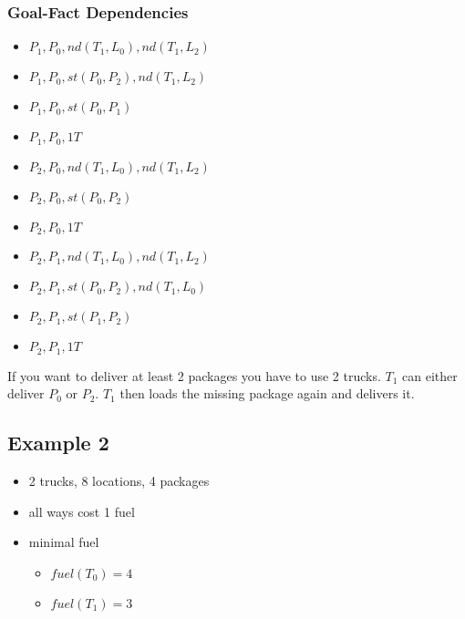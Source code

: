 \subsubsection{Goal-Fact Dependencies}
\begin{itemize}
	\item $P_1,P_0,nd(T_1,L_0),nd(T_1,L_2)$
	\item $P_1,P_0,st(P_0,P_2),nd(T_1,L_2)$
	\item $P_1,P_0,st(P_0,P_1)$
	\item $P_1,P_0,1T$
	\item $P_2,P_0,nd(T_1,L_0),nd(T_1,L_2)$
	\item $P_2,P_0,st(P_0,P_2)$
	\item $P_2,P_0,1T$
	\item $P_2,P_1,nd(T_1,L_0),nd(T_1,L_2)$
	\item $P_2,P_1,st(P_0,P_2),nd(T_1,L_0)$
	\item $P_2,P_1,st(P_1,P_2)$
	\item $P_2,P_1,1T$
\end{itemize}

If you want to deliver at least 2 packages you have to use 2 trucks. 
$T_1$ can either deliver $P_0$ or $P_2$. $T_1$ then loads the missing package again and delivers it.



\subsection*{Example 2}

	\begin{itemize}
		\item 2 trucks, 8 locations, 4 packages
		\item all ways cost 1 fuel
		\item minimal fuel
		\begin{itemize}
			\item $fuel(T_0) = 4$
			\item $fuel(T_1) = 3$
		\end{itemize}
	\end{itemize}

